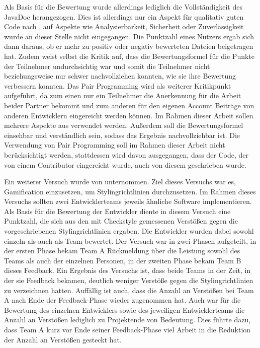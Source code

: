 \documentclass[
	oneside,  %
	ngerman, 
	final, 
	11pt, 
	a4paper, 
	1.1headlines, 
	headinclude=false, 
	footinclude=false, 
	mpinclude=false, 
	pagesize, 
	onecolumn, 
	titlepage, 
	parskip=half, 
	headsepline, 
	chapterprefix=false, 
	version=first, 
	listof=totoc, 
	bibliography=totoc, 
	toc=graduated, 
	fleqn
]{scrbook}
\begin{document}
Als Basis für die Bewertung wurde allerdings lediglich die Vollständigkeit des JavaDoc herangezogen.
Dies ist allerdings nur ein Aspekt für qualitativ guten Code nach \cite{ISO-25010}, auf Aspekte wie Analysierbarkeit, Sicherheit oder Zuverlässigkeit wurde an dieser Stelle nicht eingegangen.
Die Punktzahl eines Nutzers ergab sich dann daraus, ob er mehr zu positiv oder negativ bewerteten Dateien beigetragen hat.
Zudem weist \cite{Prause2012} selbst die Kritik auf, dass die Bewertungsformel für die Punkte der Teilnehmer undurchsichtig war und somit die Teilnehmer nicht beziehungsweise nur schwer nachvollziehen konnten, wie sie ihre Bewertung verbessern konnten.
Das Pair Programming wird als weiterer Kritikpunkt aufgeführt, da zum einen nur ein Teilnehmer die Anerkennung für die Arbeit beider Partner bekommt und zum anderen für den eigenen Account Beiträge von anderen Entwicklern eingereicht werden können.
Im Rahmen dieser Arbeit sollen mehrere Aspekte aus \cite{ISO-25010} verwendet werden. Außerdem soll die Bewertungsformel einsehbar und verständlich sein, sodass das Ergebnis nachvollziehbar ist.
Die Verwendung von Pair Programming soll im Rahmen dieser Arbeit nicht berücksichtigt werden, stattdessen wird davon ausgegangen, dass der Code, der von einem Contributor eingereicht wurde, auch von diesem geschrieben wurde.

Ein weiterer Versuch wurde von \cite{PJ2015} unternommen.
Ziel dieses Versuchs war es, Gamification einzusetzen, um Stylingrichtlinien durchzusetzen.
Im Rahmen dieses Versuchs sollten zwei Entwicklerteams jeweils ähnliche Software implementieren. 
Als Basis für die Bewertung der Entwickler diente in diesem Versuch eine Punktzahl, die sich aus den mit Checkstyle gemessenen Verstößen gegen die vorgeschriebenen Stylingrichtlinien ergaben.
Die Entwickler wurden dabei sowohl einzeln als auch als Team bewertet.
Der Versuch war in zwei Phasen aufgeteilt, in der ersten Phase bekam Team A Rückmeldung über die Leistung sowohl des Teams als auch der einzelnen Personen, in der zweiten Phase bekam Team B dieses Feedback.
Ein Ergebnis des Versuchs ist, dass beide Teams in der Zeit, in der sie Feedback bekamen, deutlich weniger Verstöße gegen die Stylingrichtlinien zu verzeichnen hatten.
Auffällig ist auch, dass die Anzahl an Verstößen bei Team A nach Ende der Feedback-Phase wieder zugenommen hat.
Auch war für die Bewertung des einzelnen Entwicklers sowie des jeweiligen Entwicklerteams die Anzahl an Verstößen lediglich zu Projektende von Bedeutung.
Dies führte dazu, dass Team A kurz vor Ende seiner Feedback-Phase viel Arbeit in die Reduktion der Anzahl an Verstößen gesteckt hat.
\end{document}

